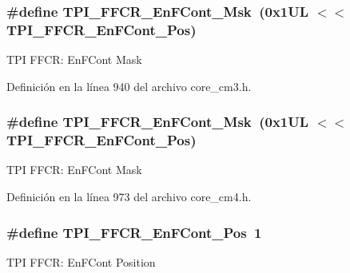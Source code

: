\subsubsection[{\texorpdfstring{T\+P\+I\+\_\+\+F\+F\+C\+R\+\_\+\+En\+F\+Cont\+\_\+\+Msk}{TPI_FFCR_EnFCont_Msk}}]{\setlength{\rightskip}{0pt plus 5cm}\#define T\+P\+I\+\_\+\+F\+F\+C\+R\+\_\+\+En\+F\+Cont\+\_\+\+Msk~(0x1\+U\+L $<$$<$ T\+P\+I\+\_\+\+F\+F\+C\+R\+\_\+\+En\+F\+Cont\+\_\+\+Pos)}\hypertarget{group___c_m_s_i_s___t_p_i_ga27d1ecf2e0ff496df03457a2a97cb2c9}{}\label{group___c_m_s_i_s___t_p_i_ga27d1ecf2e0ff496df03457a2a97cb2c9}
T\+PI F\+F\+CR\+: En\+F\+Cont Mask 

Definición en la línea 940 del archivo core\+\_\+cm3.\+h.

\subsubsection[{\texorpdfstring{T\+P\+I\+\_\+\+F\+F\+C\+R\+\_\+\+En\+F\+Cont\+\_\+\+Msk}{TPI_FFCR_EnFCont_Msk}}]{\setlength{\rightskip}{0pt plus 5cm}\#define T\+P\+I\+\_\+\+F\+F\+C\+R\+\_\+\+En\+F\+Cont\+\_\+\+Msk~(0x1\+U\+L $<$$<$ T\+P\+I\+\_\+\+F\+F\+C\+R\+\_\+\+En\+F\+Cont\+\_\+\+Pos)}\hypertarget{group___c_m_s_i_s___t_p_i_ga27d1ecf2e0ff496df03457a2a97cb2c9}{}\label{group___c_m_s_i_s___t_p_i_ga27d1ecf2e0ff496df03457a2a97cb2c9}
T\+PI F\+F\+CR\+: En\+F\+Cont Mask 

Definición en la línea 973 del archivo core\+\_\+cm4.\+h.

\subsubsection[{\texorpdfstring{T\+P\+I\+\_\+\+F\+F\+C\+R\+\_\+\+En\+F\+Cont\+\_\+\+Pos}{TPI_FFCR_EnFCont_Pos}}]{\setlength{\rightskip}{0pt plus 5cm}\#define T\+P\+I\+\_\+\+F\+F\+C\+R\+\_\+\+En\+F\+Cont\+\_\+\+Pos~1}\hypertarget{group___c_m_s_i_s___t_p_i_ga99e58a0960b275a773b245e2b69b9a64}{}\label{group___c_m_s_i_s___t_p_i_ga99e58a0960b275a773b245e2b69b9a64}
T\+PI F\+F\+CR\+: En\+F\+Cont Position 

